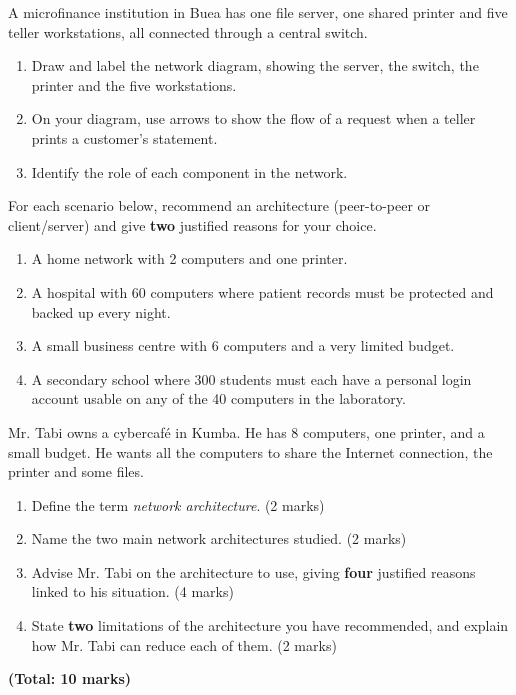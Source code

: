 \documentclass[11pt]{article}
\newcounter{popsec}
\newcounter{popsub}
\newcommand{\courssub}[1]{%
  \stepcounter{popsub}%
  \par\vspace{9pt}\noindent{\popxbold\fontsize{11.5}{13}\selectfont\color{popink}{\color{poporange}\thepopsec.\thepopsub}\hspace{6pt}#1}\par\nopagebreak\vspace{4pt}
}
\begin{document}
\begin{exercice}
A microfinance institution in Buea has one file server, one shared printer and five teller workstations, all connected through a central switch.
\begin{enumerate}
\item Draw and label the network diagram, showing the server, the switch, the printer and the five workstations.
\item On your diagram, use arrows to show the flow of a request when a teller prints a customer's statement.
\item Identify the role of each component in the network.
\end{enumerate}
\end{exercice}

\begin{exercice}
For each scenario below, recommend an architecture (peer-to-peer or client/server) and give \textbf{two} justified reasons for your choice.
\begin{enumerate}
\item A home network with 2 computers and one printer.
\item A hospital with 60 computers where patient records must be protected and backed up every night.
\item A small business centre with 6 computers and a very limited budget.
\item A secondary school where 300 students must each have a personal login account usable on any of the 40 computers in the laboratory.
\end{enumerate}
\end{exercice}

\courssub{I prepare for the GCE}

\begin{exercice}
Mr. Tabi owns a cybercafé in Kumba. He has 8 computers, one printer, and a small budget. He wants all the computers to share the Internet connection, the printer and some files.
\begin{enumerate}
\item Define the term \emph{network architecture}. \hfill (2 marks)
\item Name the two main network architectures studied. \hfill (2 marks)
\item Advise Mr. Tabi on the architecture to use, giving \textbf{four} justified reasons linked to his situation. \hfill (4 marks)
\item State \textbf{two} limitations of the architecture you have recommended, and explain how Mr. Tabi can reduce each of them. \hfill (2 marks)
\end{enumerate}
\hfill \textbf{(Total: 10 marks)}
\end{exercice}
\end{document}
